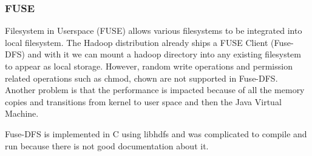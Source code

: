 \subsubsection{FUSE}

Filesystem in Userspace (FUSE) allows various filesystems to be integrated into local filesystem. The Hadoop distribution already ships a FUSE Client (Fuse-DFS) and with it we can mount a hadoop directory into any existing filesystem to appear as local storage.
However, random write operations and permission related operations such as chmod, chown are not supported in Fuse-DFS. Another problem is that the performance is impacted because of all the memory copies and transitions from kernel to user space and then the Java Virtual Machine.

Fuse-DFS is implemented in C using libhdfs and was complicated to compile and run because there is not good documentation about it.
